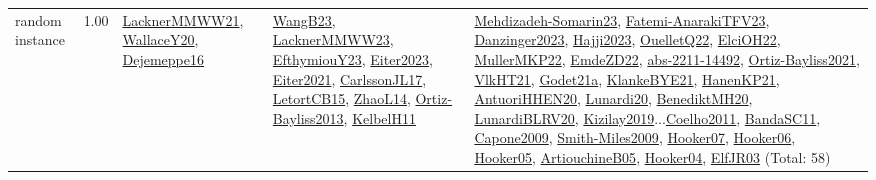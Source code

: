 {\begin{longtable}{p{3cm}r>{\raggedright\arraybackslash}p{6cm}>{\raggedright\arraybackslash}p{6cm}>{\raggedright\arraybackslash}p{8cm}}
\index{random instance}\index{Benchmarks!random instance}random instance &  1.00 & \hyperref[detail:LacknerMMWW21]{LacknerMMWW21}, \hyperref[detail:WallaceY20]{WallaceY20}, \hyperref[detail:Dejemeppe16]{Dejemeppe16} & \hyperref[detail:WangB23]{WangB23}, \hyperref[detail:LacknerMMWW23]{LacknerMMWW23}, \hyperref[detail:EfthymiouY23]{EfthymiouY23}, \hyperref[detail:Eiter2023]{Eiter2023}, \hyperref[detail:Eiter2021]{Eiter2021}, \hyperref[detail:CarlssonJL17]{CarlssonJL17}, \hyperref[detail:LetortCB15]{LetortCB15}, \hyperref[detail:ZhaoL14]{ZhaoL14}, \hyperref[detail:Ortiz-Bayliss2013]{Ortiz-Bayliss2013}, \hyperref[detail:KelbelH11]{KelbelH11} & \hyperref[detail:Mehdizadeh-Somarin23]{Mehdizadeh-Somarin23}, \hyperref[detail:Fatemi-AnarakiTFV23]{Fatemi-AnarakiTFV23}, \hyperref[detail:Danzinger2023]{Danzinger2023}, \hyperref[detail:Hajji2023]{Hajji2023}, \hyperref[detail:OuelletQ22]{OuelletQ22}, \hyperref[detail:ElciOH22]{ElciOH22}, \hyperref[detail:MullerMKP22]{MullerMKP22}, \hyperref[detail:EmdeZD22]{EmdeZD22}, \hyperref[detail:abs-2211-14492]{abs-2211-14492}, \hyperref[detail:Ortiz-Bayliss2021]{Ortiz-Bayliss2021}, \hyperref[detail:VlkHT21]{VlkHT21}, \hyperref[detail:Godet21a]{Godet21a}, \hyperref[detail:KlankeBYE21]{KlankeBYE21}, \hyperref[detail:HanenKP21]{HanenKP21}, \hyperref[detail:AntuoriHHEN20]{AntuoriHHEN20}, \hyperref[detail:Lunardi20]{Lunardi20}, \hyperref[detail:BenediktMH20]{BenediktMH20}, \hyperref[detail:LunardiBLRV20]{LunardiBLRV20}, \hyperref[detail:Kizilay2019]{Kizilay2019}...\hyperref[detail:Coelho2011]{Coelho2011}, \hyperref[detail:BandaSC11]{BandaSC11}, \hyperref[detail:Capone2009]{Capone2009}, \hyperref[detail:Smith-Miles2009]{Smith-Miles2009}, \hyperref[detail:Hooker07]{Hooker07}, \hyperref[detail:Hooker06]{Hooker06}, \hyperref[detail:Hooker05]{Hooker05}, \hyperref[detail:ArtiouchineB05]{ArtiouchineB05}, \hyperref[detail:Hooker04]{Hooker04}, \hyperref[detail:ElfJR03]{ElfJR03} (Total: 58)\\

\end{longtable}}
